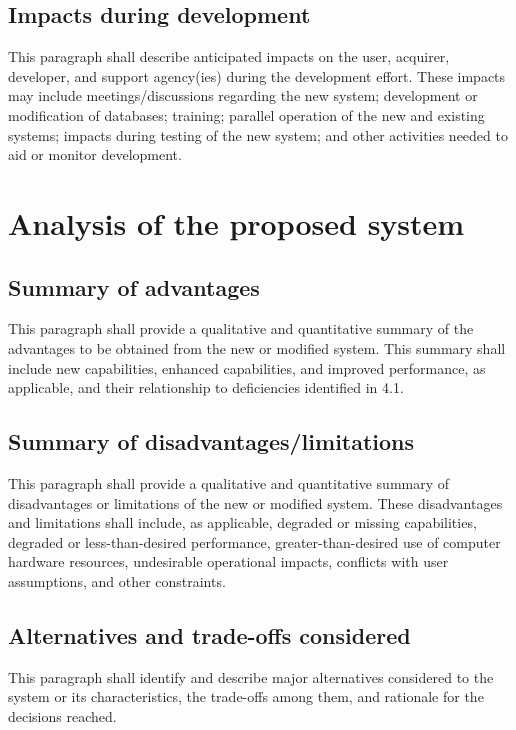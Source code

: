 \documentclass{fidata-report-template}
\begin{document}
\subsection{Impacts during development}

This paragraph shall describe anticipated impacts on the user, acquirer,
developer, and support agency(ies) during the development effort. These
impacts may include meetings/discussions regarding the new system;
development or modification of databases; training; parallel operation
of the new and existing systems; impacts during testing of the new
system; and other activities needed to aid or monitor development.

\section{Analysis of the proposed system}

\subsection{Summary of advantages}

This paragraph shall provide a qualitative and quantitative summary of
the advantages to be obtained from the new or modified system. This
summary shall include new capabilities, enhanced capabilities, and
improved performance, as applicable, and their relationship to
deficiencies identified in 4.1.

\subsection{Summary of disadvantages/limitations}

This paragraph shall provide a qualitative and quantitative summary of
disadvantages or limitations of the new or modified system. These
disadvantages and limitations shall include, as applicable, degraded or
missing capabilities, degraded or less-than-desired performance,
greater-than-desired use of computer hardware resources, undesirable
operational impacts, conflicts with user assumptions, and other
constraints.

\subsection{Alternatives and trade-offs considered}

This paragraph shall identify and describe major alternatives considered
to the system or its characteristics, the trade-offs among them, and
rationale for the decisions reached.
\end{document}

